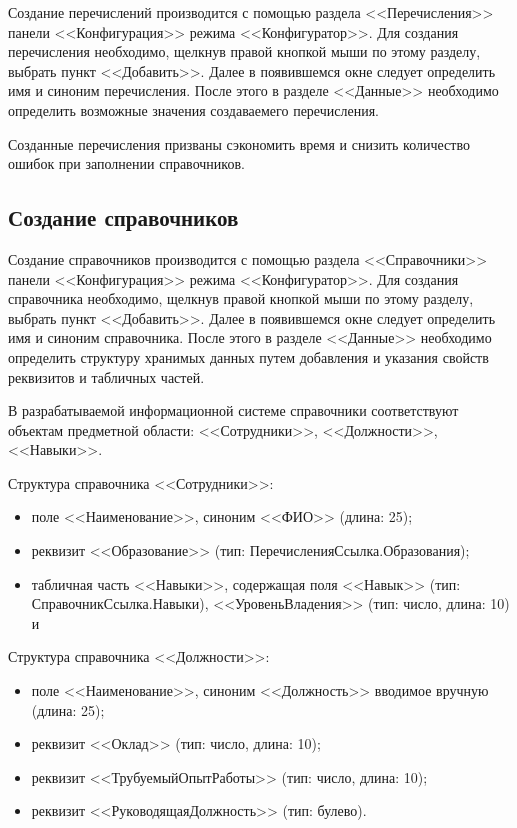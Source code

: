 Создание перечислений производится с помощью раздела <<Перечисления>>
панели <<Конфигурация>> режима <<Конфигуратор>>. Для создания
перечисления необходимо, щелкнув правой кнопкой мыши по этому
разделу, выбрать пункт <<Добавить>>. Далее в появившемся окне
следует определить имя и синоним перечисления.
После этого в разделе <<Данные>> необходимо определить возможные
значения создаваемего перечисления.

Созданные перечисления призваны сэкономить время и снизить количество
ошибок при заполнении справочников.

\subsection{Создание справочников}

Создание справочников производится с помощью раздела <<Справочники>>
панели <<Конфигурация>> режима <<Конфигуратор>>.
Для создания справочника необходимо, щелкнув правой кнопкой мыши по этому
разделу, выбрать пункт <<Добавить>>. Далее в появившемся окне
следует определить имя и синоним справочника.
После этого в разделе <<Данные>> необходимо определить структуру
хранимых данных путем добавления и указания свойств реквизитов
и табличных частей.

В разрабатываемой информационной системе справочники соответствуют
объектам предметной области: <<Сотрудники>>, <<Должности>>,
<<Навыки>>.

Структура справочника <<Сотрудники>>:
\begin{itemize}
  \item поле <<Наименование>>, синоним <<ФИО>> (длина: 25);
  \item реквизит <<Образование>> (тип: ПеречисленияСсылка.Образования);
  \item табличная часть <<Навыки>>, содержащая поля
    <<Навык>> (тип: СправочникСсылка.Навыки),
    <<УровеньВладения>> (тип: число, длина: 10) и
\end{itemize}

Структура справочника <<Должности>>:
\begin{itemize}
  \item поле <<Наименование>>, синоним <<Должность>> вводимое вручную (длина: 25);
  \item реквизит <<Оклад>> (тип: число, длина: 10);
  \item реквизит <<ТрубуемыйОпытРаботы>> (тип: число, длина: 10);
  \item реквизит <<РуководящаяДолжность>> (тип: булево).
\end{itemize}

